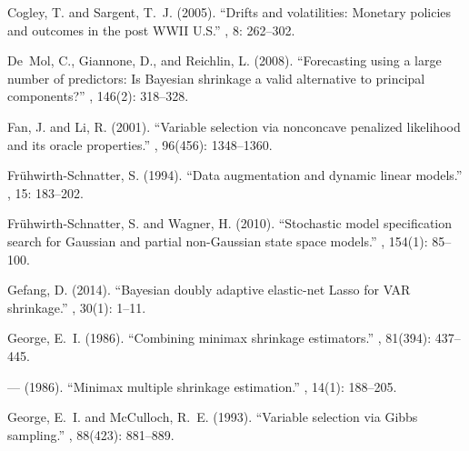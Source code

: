 \documentclass[ba]{imsart}
\numberwithin{equation}{section}
\theoremstyle{plain}
\begin{document}
\begin{thebibliography}{70}
Cogley, T. and Sargent, T.~J. (2005).
\newblock \enquote{Drifts and volatilities: {M}onetary policies and outcomes in
  the post {WWII U.S.}}
, 8: 262--302.
\endbibitem

De~Mol, C., Giannone, D., and Reichlin, L. (2008).
\newblock \enquote{Forecasting using a large number of predictors: Is Bayesian
  shrinkage a valid alternative to principal components?}
, 146(2): 318--328.
\endbibitem

Fan, J. and Li, R. (2001).
\newblock \enquote{Variable selection via nonconcave penalized likelihood and
  its oracle properties.}
, 96(456):
  1348--1360.
\endbibitem

Fr{\"u}hwirth-Schnatter, S. (1994).
\newblock \enquote{Data augmentation and dynamic linear models.}
, 15: 183--202.
\endbibitem

Fr{\"u}hwirth-Schnatter, S. and Wagner, H. (2010).
\newblock \enquote{Stochastic model specification search for Gaussian and
  partial non-Gaussian state space models.}
, 154(1): 85--100.
\endbibitem

Gefang, D. (2014).
\newblock \enquote{Bayesian doubly adaptive elastic-net Lasso for VAR
  shrinkage.}
, 30(1): 1--11.
\endbibitem

George, E.~I. (1986{}).
\newblock \enquote{Combining minimax shrinkage estimators.}
, 81(394):
  437--445.
\endbibitem

--- (1986{}).
\newblock \enquote{Minimax multiple shrinkage estimation.}
, 14(1): 188--205.
\endbibitem

George, E.~I. and McCulloch, R.~E. (1993).
\newblock \enquote{Variable selection via Gibbs sampling.}
, 88(423):
  881--889.
\endbibitem


\end{thebibliography}
\end{document}
